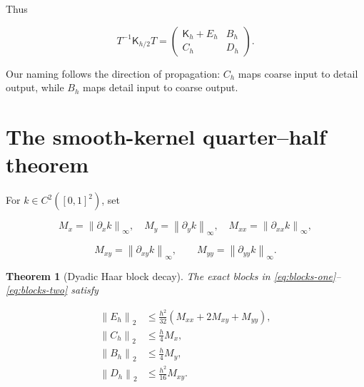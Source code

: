\documentclass[11pt]{article}
\newtheorem{theorem}{Theorem}[section]
\theoremstyle{definition}
\theoremstyle{remark}
\newcommand{\norm}[1]{\left\lVert #1\right\rVert}
\begin{document}
Thus

\begin{equation}
T^{-1}\mathsf K_{h/2}T=
\begin{pmatrix}
\mathsf K_h+E_h&B_h\\
C_h&D_h
\end{pmatrix}.
\label{eq:block-form}
\end{equation}

Our naming follows the direction of propagation: $C_h$ maps coarse input to
detail output, while $B_h$ maps detail input to coarse output.

\section{The smooth-kernel quarter--half theorem}
\label{sec:smooth}

For $k\in C^2([0,1]^2)$, set

\[
M_x=\norm{\partial_x k}_\infty,\quad
M_y=\norm{\partial_y k}_\infty,\quad
M_{xx}=\norm{\partial_{xx} k}_\infty,
\]

\[
M_{xy}=\norm{\partial_{xy} k}_\infty,\qquad
M_{yy}=\norm{\partial_{yy} k}_\infty.
\]

\begin{theorem}[Dyadic Haar block decay]
\label{thm:haar-decay}
The exact blocks in \eqref{eq:blocks-one}--\eqref{eq:blocks-two} satisfy

\begin{align}
\norm{E_h}_2
&\le\frac{h^2}{32}(M_{xx}+2M_{xy}+M_{yy}),
\label{eq:E-bound}\\
\norm{C_h}_2
&\le\frac h4M_x,
\label{eq:C-bound}\\
\norm{B_h}_2
&\le\frac h4M_y,
\label{eq:B-bound}\\
\norm{D_h}_2
&\le\frac{h^2}{16}M_{xy}.
\label{eq:D-bound}
\end{align}
\end{theorem}
\end{document}
